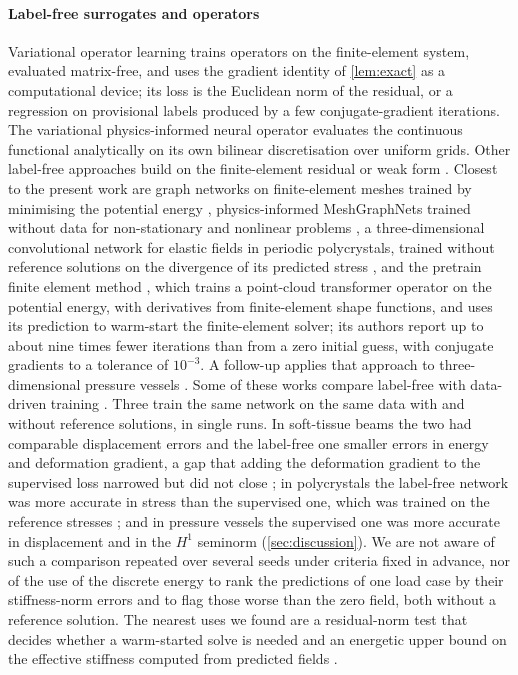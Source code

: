 \paragraph{Label-free surrogates and operators}
Variational operator learning \cite{Xu2024VOL} trains operators on the finite-element
system, evaluated matrix-free, and uses the gradient identity of \cref{lem:exact} as a
computational device; its loss is the Euclidean norm of the residual, or a regression on
provisional labels produced by a few conjugate-gradient iterations. The variational
physics-informed neural operator \cite{Eshaghi2025VINO} evaluates the continuous functional
analytically on its own bilinear discretisation over uniform grids. Other label-free
approaches build on the finite-element residual or weak form
\cite{Lee2025FEONet,Uriarte2022,Gao2022,Goswami2022}. Closest to the present work are graph
networks on finite-element meshes trained by minimising the potential energy
\cite{Dalton2023}, physics-informed MeshGraphNets trained without data for non-stationary
and nonlinear problems \cite{Wurth2024}, a three-dimensional convolutional network for
elastic fields in periodic polycrystals, trained without reference solutions on the
divergence of its predicted stress \cite{MonteiroFernandes2025}, and the pretrain finite
element method \cite{Wang2026PretrainFEM}, which trains a point-cloud transformer operator
on the potential energy, with derivatives from finite-element shape functions, and uses its
prediction to warm-start the finite-element solver; its authors report up to about nine
times fewer iterations than from a zero initial guess, with conjugate gradients to a
tolerance of $10^{-3}$. A follow-up applies that approach to three-dimensional pressure
vessels \cite{Sun2026FEVessel}. Some of these works compare label-free with data-driven
training \cite{Dalton2023,Wurth2024,MonteiroFernandes2025,Sun2026FEVessel}. Three train the
same network on the same data with and without reference solutions, in single runs. In
soft-tissue beams the two had comparable displacement errors and the label-free one smaller
errors in energy and deformation gradient, a gap that adding the deformation gradient to the
supervised loss narrowed but did not close \cite{Dalton2023}; in polycrystals the label-free
network was more accurate in stress than the supervised one,
which was trained on the reference stresses \cite{MonteiroFernandes2025};
and in pressure vessels the supervised one was more accurate in displacement and in the
$H^1$ seminorm \cite{Sun2026FEVessel} (\cref{sec:discussion}). We are not aware of such a
comparison
repeated over several seeds under criteria fixed in advance, nor of the use of the discrete
energy to rank the predictions of one load case by their stiffness-norm errors and to flag
those worse than the zero field, both without a reference solution. The nearest uses we
found are a residual-norm test that
decides whether a warm-started solve is needed \cite{Wang2026PretrainFEM} and an energetic
upper bound on the effective stiffness computed from predicted fields
\cite{MonteiroFernandes2025}.

